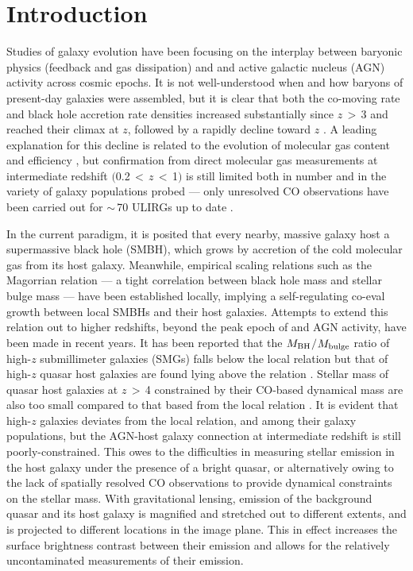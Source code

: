 \documentclass[]{emulateapj}
\begin{document}
\section{Introduction}
Studies of galaxy evolution have been focusing on the interplay between baryonic physics
(\eg feedback and gas dissipation) and \SF and active galactic nucleus (AGN) activity across cosmic epochs.
It is not well-understood when and how baryons of present-day galaxies were assembled, 
but it is clear that both the co-moving \SF rate and black hole accretion rate densities
increased substantially since $z$\,$>$\,3 and reached their climax at $z$, followed by 
a rapidly decline toward $z$ \citep[\eg][]{Hopkins06a, Madau14a}. 
A leading explanation for this decline is related to the evolution of molecular gas content and 
\SF efficiency \citep[]{Erb06a, CW13, Walter14a},
but confirmation from direct molecular gas measurements at intermediate redshift 
$($0.2\,$<$\,$z$\,$<$\,1$)$ is still limited both in number and in the variety of galaxy populations probed --- 
only unresolved CO observations have been carried out for $\sim$\,70 ULIRGs up to date \citep{Combes11a, Combes13a}.

In the current paradigm, it is posited that every nearby, massive galaxy host a supermassive black hole (SMBH), which
grows by accretion of the cold molecular gas from its host galaxy.
Meanwhile, empirical scaling relations such as the Magorrian relation \citep{Magorrian98a}
--- a tight correlation between black hole mass and stellar bulge mass ---
have been established locally, implying a self-regulating co-eval growth between local SMBHs and their host galaxies.
Attempts to extend this relation out to higher redshifts, beyond the peak epoch 
of \SF and AGN activity, have been made in recent years.
It has been reported that the $M_{\rm BH}$$/$$M_{\rm bulge}$ ratio of high-$z$ submillimeter galaxies (SMGs) falls below 
the local relation \citep[\eg][]{Borys05a,Alexander08a} but that of high-$z$ quasar host galaxies are found 
lying above 
the relation \citep[\eg][]{McLure06a,Peng06a}.
Stellar mass of quasar host galaxies at $z$\,$>$\,4 constrained by their CO-based dynamical mass 
are also too small compared to that based from the local relation \citep{Walter04a, Riechers08a,Coppin08a}. 
It is evident that high-$z$ galaxies deviates from the local relation, and among their galaxy populations, but
the AGN-host galaxy connection at intermediate redshift is still poorly-constrained. 
This owes to the difficulties in measuring stellar emission in the host galaxy under the presence of a bright quasar, or alternatively
owing to the lack of spatially resolved CO observations to provide dynamical constraints on the stellar mass. 
With gravitational lensing, emission of the background quasar and its host galaxy 
is magnified and stretched out to different extents, and is projected to different locations in the image plane.
This in effect increases the surface brightness contrast between their emission and allows for the
relatively uncontaminated measurements of their emission. 
\end{document}
